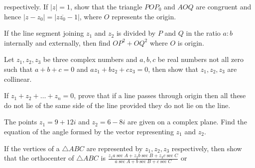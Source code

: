   respectively. If $|z| = 1$, show that the triangle $POP_0$ and $AOQ$ are congruent and hence $|z - z_0| = |z\overline{z_0} - 1|$,
  where $O$ represents the origin.
\item If the line segment joining $z_1$ and $z_2$ is divided by $P$ and $Q$ in the ratio $a:b$ internally and externally,
  then find $OP^2 + OQ^2$ where $O$ is origin.
\item Let $z_1, z_2, z_3$ be three complex numbers and $a, b, c$ be real numbers not all zero such that $a + b + c = 0$
  and $az_1 + bz_2 + cz_3 = 0$, then show that $z_1, z_2, z_3$ are collinear.
\item If $z_1 + z_2 + \ldots + z_n = 0$, prove that if a line passes through origin then all these do not lie of the same
  side of the line provided they do not lie on the line.
\item The points $z_1 = 9 + 12i$ and $z_2 = 6 - 8i$ are given on a complex plane. Find the equation of the angle formed
  by the vector representing $z_1$ and $z_2$.
\item If the vertices of a $\triangle ABC$ are represented by $z_1, z_2, z_3$ respectively, then show that the
  orthocenter of $\triangle ABC$ is $\frac{z_1a\sec A + z_2b\sec B + z_3c\sec C}{a\sec A + b\sec B + c\sec C}$ or


